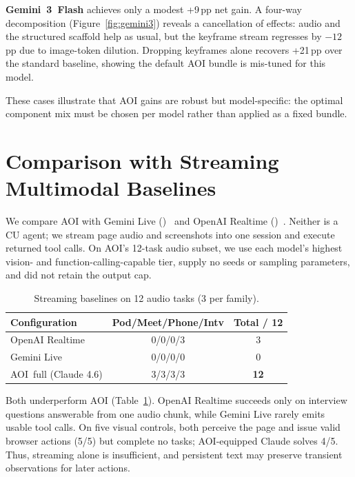 \documentclass[letterpaper]{article} %
\begin{document}
\textbf{Gemini~3~Flash} achieves only a modest +9\,pp net gain. A four-way decomposition (Figure~\ref{fig:gemini3}) reveals a cancellation of effects: audio and the structured scaffold help as usual, but the keyframe stream regresses by $-12$\,pp due to image-token dilution. Dropping keyframes alone recovers +21\,pp over the standard baseline, showing the default AOI bundle is mis-tuned for this model.

These cases illustrate that AOI gains are robust but model-specific: the optimal component mix must be chosen per model rather than applied as a fixed bundle.

\section{Comparison with Streaming Multimodal Baselines}
\label{sec:streaming}

We compare AOI with Gemini Live ()~\citep{geminilive} and OpenAI Realtime ()~\citep{openairealtime}. Neither is a CU agent; we stream page audio and screenshots into one session and execute returned tool calls. On AOI's 12-task audio subset, we use each model's highest vision- and function-calling-capable tier, supply no seeds or sampling parameters, and did not retain the output cap.

\begin{table}[htbp]
\centering
\setlength{\tabcolsep}{5pt}
\begin{tabular}{@{}lcc@{}}
\toprule
\textbf{Configuration} & \textbf{Pod/Meet/Phone/Intv} & \textbf{Total / 12} \\
\midrule
OpenAI Realtime          & 0/0/0/3 & 3 \\
Gemini Live              & 0/0/0/0 & 0 \\
\rowcolor{bestcolor}
AOI~full (Claude 4.6)    & 3/3/3/3 & \textbf{12} \\
\bottomrule
\end{tabular}
\caption{Streaming baselines on 12 audio tasks (3 per family).}
\label{tab:streaming}
\end{table}

Both underperform AOI (Table~\ref{tab:streaming}). OpenAI Realtime succeeds only on interview questions answerable from one audio chunk, while Gemini Live rarely emits usable tool calls. On five visual controls, both perceive the page and issue valid browser actions (5/5) but complete no tasks; AOI-equipped Claude solves 4/5. Thus, streaming alone is insufficient, and persistent text may preserve transient observations for later actions.
\end{document}
